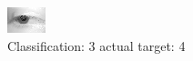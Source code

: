 \begin{figure}[h!]
\begin{center}
\includegraphics[width=0.60\columnwidth]{figures/ID2687_class_3_target_4.png}
\end{center}
\caption{ Classification: 3 actual target: 4}
\label{fig:ID2687_class_3_target_4}
\end{figure}
